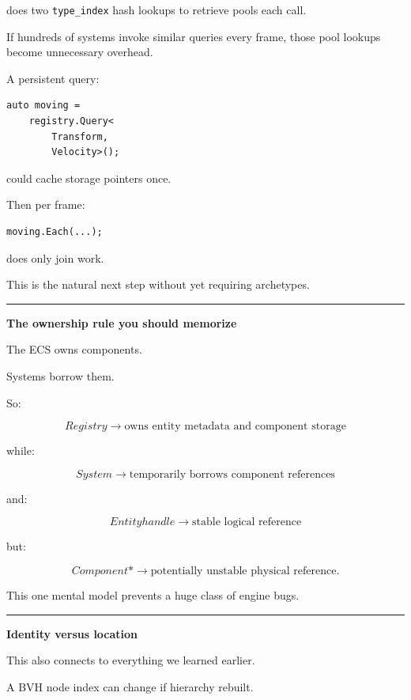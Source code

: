 does two \texttt{type\_index} hash lookups to retrieve pools each call.

If hundreds of systems invoke similar queries every frame, those pool lookups become unnecessary overhead.

A persistent query:

\begin{verbatim}
auto moving =
    registry.Query<
        Transform,
        Velocity>();
\end{verbatim}

could cache storage pointers once.

Then per frame:

\begin{verbatim}
moving.Each(...);
\end{verbatim}

does only join work.

This is the natural next step without yet requiring archetypes.

\begin{center}\rule{0.5\linewidth}{0.5pt}\end{center}

\textbf{The ownership rule you should memorize}

The ECS owns components.

Systems borrow them.

So:

\[
\boxed{
Registry
\rightarrow
\text{owns entity metadata and component storage}
}
\]

while:

\[
\boxed{
System
\rightarrow
\text{temporarily borrows component references}
}
\]

and:

\[
\boxed{
Entity handle
\rightarrow
\text{stable logical reference}
}
\]

but:

\[
\boxed{
Component*
\rightarrow
\text{potentially unstable physical reference}.
}
\]

This one mental model prevents a huge class of engine bugs.

\begin{center}\rule{0.5\linewidth}{0.5pt}\end{center}

\textbf{Identity versus location}

This also connects to everything we learned earlier.

A BVH node index can change if hierarchy rebuilt.

